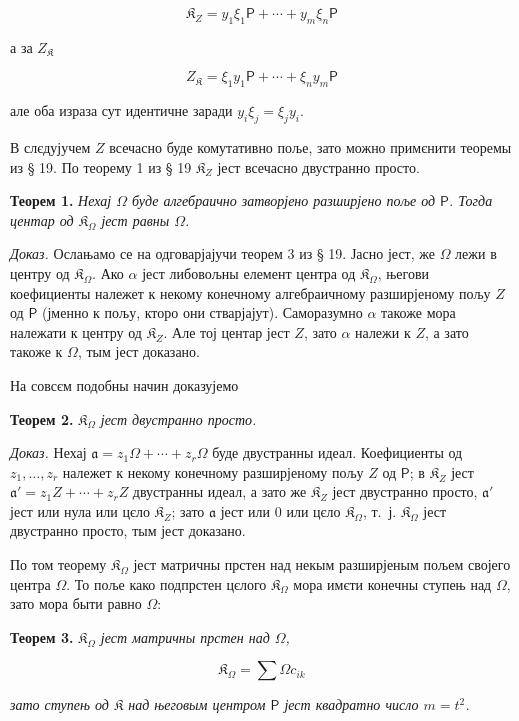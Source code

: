 \documentclass[11pt]{article}
\begin{document}
\[
\mathfrak K_Z=y_1\xi_1\mathsf P+\cdots+y_m\xi_n\mathsf P
\]

а за \(Z_{\mathfrak K}\)

\[
Z_{\mathfrak K}=\xi_1y_1\mathsf P+\cdots+\xi_ny_m\mathsf P
\]

але оба израза сут идентичне заради \(y_i\xi_j=\xi_jy_i\).

В слєдујучем \(Z\) всечасно буде комутативно поље, зато можно примєнити теоремы из § 19. По теорему 1 из § 19 \(\mathfrak K_Z\) јест всечасно двустранно просто.

\textbf{Теорем 1.} \emph{Нехај \(\Omega\) буде алгебраично затворјено разширјено поље од \(\mathsf P\). Тогда центар од \(\mathfrak K_\Omega\) јест равны \(\Omega\).}

\emph{Доказ.} Ослањамо се на одговарјајучи теорем 3 из § 19. Јасно јест, же \(\Omega\) лежи в центру од \(\mathfrak K_\Omega\). Ако \(\alpha\) јест либовољны елемент центра од \(\mathfrak K_\Omega\), његови коефициенты належет к некому конечному алгебраичному разширјеному пољу \(Z\) од \(\mathsf P\) (јменно к пољу, кторо они стварјајут). Саморазумно \(\alpha\) такоже мора належати к центру од \(\mathfrak K_Z\). Але тој центар јест \(Z\), зато \(\alpha\) належи к \(Z\), а зато такоже к \(\Omega\), тым јест доказано.

На совсєм подобны начин доказујемо

\textbf{Теорем 2.} \emph{\(\mathfrak K_\Omega\) јест двустранно просто.}

\emph{Доказ.} Нехај \(\mathfrak a=z_1\Omega+\cdots+z_r\Omega\) буде двустранны идеал. Коефициенты од \(z_1,\ldots,z_r\) належет к некому конечному разширјеному пољу \(Z\) од \(\mathsf P\); в \(\mathfrak K_Z\) јест \(\mathfrak a'=z_1Z+\cdots+z_rZ\) двустранны идеал, а зато же \(\mathfrak K_Z\) јест двустранно просто, \(\mathfrak a'\) јест или нула или цєло \(\mathfrak K_Z\); зато \(\mathfrak a\) јест или 0 или цєло \(\mathfrak K_\Omega\), т.~ј. \(\mathfrak K_\Omega\) јест двустранно просто, тым јест доказано.

По том теорему \(\mathfrak K_\Omega\) јест матричны прстен над некым разширјеным пољем својего центра \(\Omega\). То поље како подпрстен цєлого \(\mathfrak K_\Omega\) мора имєти конечны ступењ над \(\Omega\), зато мора быти равно \(\Omega\):

\textbf{Теорем 3.} \emph{\(\mathfrak K_\Omega\) јест матричны прстен над \(\Omega\),}

\[
\mathfrak K_\Omega=\sum\Omega c_{ik}
\]

\emph{зато ступењ од \(\mathfrak K\) над његовым центром \(\mathsf P\) јест квадратно число \(m=t^2\).}
\end{document}
